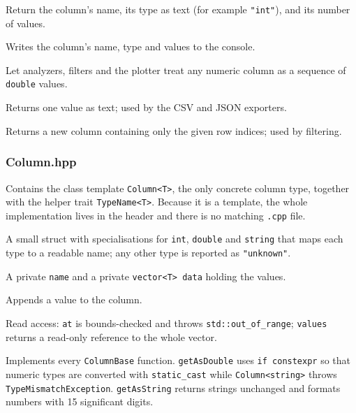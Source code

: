 \documentclass[11pt,a4paper]{article}
\newcommand{\code}[1]{\texttt{#1}}
\begin{document}
\begin{description}[noitemsep,leftmargin=1.5em]
  \item[\code{getName()}, \code{typeName()}, \code{size()}] Return the column's name, its type as
    text (for example \code{"int"}), and its number of values.
  \item[\code{print()}] Writes the column's name, type and values to the console.
  \item[\code{isNumeric()}, \code{getAsDouble(i)}] Let analyzers, filters and the plotter treat any
    numeric column as a sequence of \code{double} values.
  \item[\code{getAsString(i)}] Returns one value as text; used by the CSV and JSON exporters.
  \item[\code{select(rows)}] Returns a new column containing only the given row indices; used by
    filtering.
\end{description}

\subsubsection*{Column.hpp}

Contains the class template \code{Column<T>}, the only concrete column type, together with the
helper trait \code{TypeName<T>}. Because it is a template, the whole implementation lives in the
header and there is no matching \code{.cpp} file.

\begin{description}[noitemsep,leftmargin=1.5em]
  \item[\code{TypeName<T>}] A small struct with specialisations for \code{int}, \code{double} and
    \code{string} that maps each type to a readable name; any other type is reported as
    \code{"unknown"}.
  \item[Data members] A private \code{name} and a private \code{vector<T> data} holding the values.
  \item[\code{addValue(val)}] Appends a value to the column.
  \item[\code{at(i)}, \code{values()}] Read access: \code{at} is bounds-checked and throws
    \code{std::out\_of\_range}; \code{values} returns a read-only reference to the whole vector.
  \item[Overrides] Implements every \code{ColumnBase} function. \code{getAsDouble} uses
    \code{if constexpr} so that numeric types are converted with \code{static\_cast} while
    \code{Column<string>} throws \code{TypeMismatchException}. \code{getAsString} returns strings
    unchanged and formats numbers with 15 significant digits.
\end{description}
\end{document}
